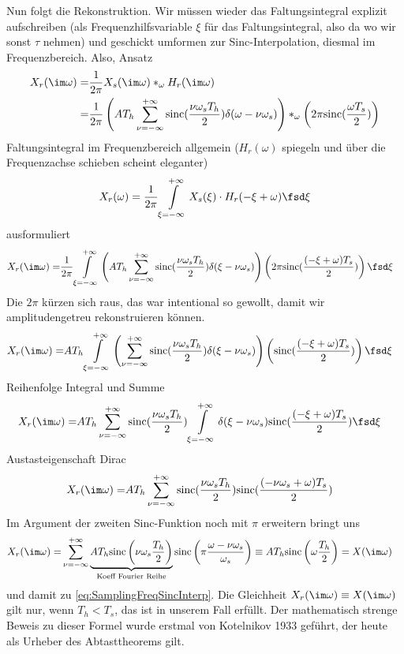 \begin{Loesung}
Nun folgt die Rekonstruktion. Wir müssen wieder das Faltungsintegral explizit aufschreiben (als
Frequenzhilfsvariable $\xi$ für das Faltungsintegral, also da wo wir sonst $\tau$ nehmen)
und geschickt umformen zur Sinc-Interpolation, diesmal im Frequenzbereich.
%
Also, Ansatz
\begin{align}
X_r(\im\omega)
=& \frac{1}{2\pi} X_s(\im\omega) \ast_\omega H_r(\im\omega)\\
=& \frac{1}{2\pi} \left(A T_h \sum_{\nu=-\infty}^{+\infty} \mathrm{sinc}(\frac{\nu \omega_s T_h}{2}) \delta(\omega-\nu \omega_s)\right)
\ast_\omega \left(2\pi \mathrm{sinc}(\frac{\omega T_s}{2})\right)
\end{align}
%
Faltungsintegral im Frequenzbereich allgemein ($H_r(\omega)$ spiegeln und über
die Frequenzachse schieben scheint eleganter)
\begin{align}
X_r(\omega) = \frac{1}{2\pi}\int\limits_{\xi=-\infty}^{+\infty} X_s(\xi) \cdot H_r(-\xi + \omega) \fsd\xi
\end{align}
ausformuliert
\begin{align}
X_r(\im\omega)
=& \frac{1}{2\pi} \int\limits_{\xi=-\infty}^{+\infty}
\left(A T_h \sum_{\nu=-\infty}^{+\infty} \mathrm{sinc}(\frac{\nu \omega_s T_h}{2}) \delta(\xi-\nu \omega_s)\right)
\left(2\pi \mathrm{sinc}(\frac{(-\xi + \omega) T_s}{2})\right)
\fsd\xi
\end{align}
Die $2\pi$ kürzen sich raus, das war intentional so gewollt, damit wir amplitudengetreu rekonstruieren können.
\begin{align}
X_r(\im\omega)
=& A T_h \int\limits_{\xi=-\infty}^{+\infty}
\left(\sum_{\nu=-\infty}^{+\infty} \mathrm{sinc}(\frac{\nu \omega_s T_h}{2}) \delta(\xi-\nu \omega_s)\right)
\left(\mathrm{sinc}(\frac{(-\xi + \omega) T_s}{2})\right)
\fsd\xi
\end{align}
Reihenfolge Integral und Summe
\begin{align}
X_r(\im\omega)
=& A T_h \sum_{\nu=-\infty}^{+\infty} \mathrm{sinc}(\frac{\nu \omega_s T_h}{2})
\int\limits_{\xi=-\infty}^{+\infty}
 \delta(\xi-\nu \omega_s)
\mathrm{sinc}(\frac{(-\xi + \omega) T_s}{2})
\fsd\xi
\end{align}
Austasteigenschaft Dirac
\begin{align}
X_r(\im\omega)
=& A T_h \sum_{\nu=-\infty}^{+\infty} \mathrm{sinc}(\frac{\nu \omega_s T_h}{2})
\mathrm{sinc}(\frac{(-\nu \omega_s + \omega) T_s}{2})
\end{align}
Im Argument der zweiten Sinc-Funktion noch mit $\pi$ erweitern bringt uns
\begin{align}
X_r(\im\omega)
=& \sum_{\nu=-\infty}^{+\infty} \underbrace{A T_h \mathrm{sinc}\left(\nu \omega_s \frac{T_h}{2}\right)}_{\text{Koeff Fourier Reihe}}
\mathrm{sinc}\left(\pi \frac{\omega -\nu \omega_s}{\omega_s}\right)
\equiv A T_h \mathrm{sinc}\left(\omega \frac{T_h}{2}\right) = X(\im\omega)
\end{align}
und damit zu \eqref{eq:SamplingFreqSincInterp}. Die Gleichheit $X_r(\im\omega)
\equiv X(\im\omega)$ gilt nur, wenn $T_h < T_s$, das ist in unserem Fall erfüllt.
Der mathematisch strenge Beweis zu dieser Formel wurde erstmal von Kotelnikov 1933 geführt, der
heute als Urheber des Abtasttheorems gilt.


\end{Loesung}
